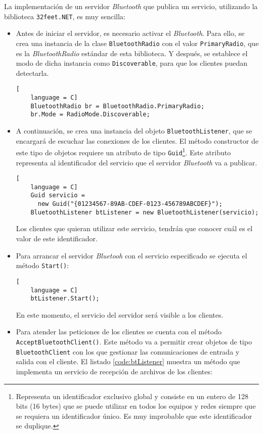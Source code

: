 La implementación de un servidor \emph{Bluetooth} que publica un servicio,
utilizando la biblioteca \texttt{32feet.NET}, es muy sencilla:
\begin{itemize}
\item Antes de iniciar el servidor, es necesario activar el \emph{Bluetooth}.
Para ello, se crea una instancia de la clase \texttt{BluetoothRadio} con
el valor \texttt{PrimaryRadio}, que es la \emph{BluetoothRadio} estándar de
esta biblioteca. Y después, se establece el modo de dicha instancia como
\texttt{Discoverable}, para que los clientes puedan detectarla.

  \begin{lstlisting}[
    language = C]
    BluetoothRadio br = BluetoothRadio.PrimaryRadio;
    br.Mode = RadioMode.Discoverable;
  \end{lstlisting}

\item A continuación, se crea una instancia del objeto
\texttt{BluetoothListener}, que se encargará de escuchar las conexiones de los
clientes. El método constructor de este tipo de objetos requiere un atributo
de tipo \texttt{Guid}\footnote{Representa un identificador exclusivo global y 
consiste en un entero de 128 bits (16 bytes) que se puede utilizar en todos los 
equipos y redes siempre que se requiera un identificador único. Es muy 
improbable que este identificador se duplique.}. Este atributo representa al 
identificador del servicio que el servidor \emph{Bluetooth} va a publicar.

  \begin{lstlisting}[
    language = C]
    Guid servicio = 
      new Guid("{01234567-89AB-CDEF-0123-456789ABCDEF}");
    BluetoothListener btListener = new BluetoothListener(servicio);
  \end{lstlisting}

Los clientes que quieran utilizar este servicio, tendrán que conocer cuál
es el valor de este identificador.

\item Para arrancar el servidor \emph{Bluetooh} con el servicio especificado
se ejecuta el método \texttt{Start()}:

  \begin{lstlisting}[
    language = C]
    btListener.Start();
  \end{lstlisting}

En este momento, el servicio del servidor será visible a los clientes.

\item Para atender las peticiones de los clientes se cuenta con el método
\texttt{AcceptBluetoothClient()}. Este método va a permitir crear objetos
de tipo \texttt{BluetoothClient} con los que gestionar las comunicaciones
de entrada y salida con el cliente. El listado \ref{code:btListener}
muestra un método que implementa un servicio de recepción de archivos de
los clientes:


\end{itemize}
